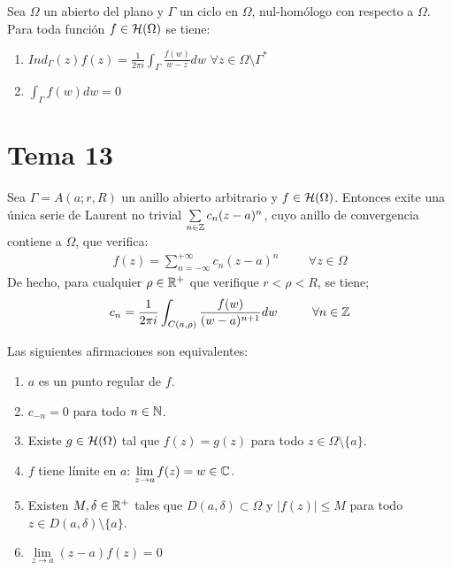 \documentclass[12pt]{article}
\begin{document}
    \begin{teo} Sea $\Omega$ un abierto del plano y $\Gamma$ un ciclo en $\Omega$, nul-homólogo con respecto a $\Omega$. Para toda función $f\in \mathcal{H}(\Omega)$ se tiene:
    \begin{enumerate}
        \item $\displaystyle Ind_\Gamma (z)f(z) = \frac{1}{2\pi i} \int_\Gamma \frac{f(w)}{w-z} dw$ \hspace{1cm} $\forall z \in \Omega \setminus \Gamma^*$
        \item $\displaystyle \int_\Gamma f(w) dw = 0$
    \end{enumerate}
    \end{teo}

    \newpage

    \section{Tema 13}

    \begin{teo} Sea $\Gamma = A(a;r,R)$ un anillo abierto arbitrario y $f\in \mathcal{H}(\Omega)$. Entonces exite una única serie de Laurent no trivial $\sum\limits_{n \in \mathbb{Z}}c_n(z-a)^n$, cuyo anillo de convergencia contiene a $\Omega$, que verifica:
    \begin{gather*}
        f(z) = \sum\limits_{n=-\infty}^{+\infty} c_n(z-a)^n \hspace{1cm} \forall z \in \Omega
    \end{gather*}
    De hecho, para cualquier $\rho\in \mathbb{R}^+$ que verifique $r < \rho < R$, se tiene;
    \begin{gather*}
        c_n = \frac{1}{2\pi i} \int_{C(a, \rho)} \frac{f(w)}{(w-a)^{n+1}}dw \hspace{1cm} \forall n \in \mathbb{Z}
    \end{gather*}
    \end{teo}

    \begin{prop}
        Las siguientes afirmaciones son equivalentes:
        \begin{enumerate}
            \item $a$ es un punto regular de $f$.
            \item $c_{-n} = 0 $ para todo $n\in \mathbb{N}$.
            \item Existe $g\in \mathcal{H}(\Omega)$ tal que $f(z) = g(z)$ para todo $z \in \Omega \setminus \{a\}$.
            \item $f$ tiene límite en $a$: $\lim\limits_{z\to a } f(z) = w \in \mathbb{C}$.
            \item Existen $M,\delta\in \mathbb{R}^+$ tales que $D(a, \delta) \subset \Omega$ y $|f(z)|\leq M$ para todo $z\in D(a,\delta)\setminus \{a\}$.
            \item $\lim\limits_{z\to a} (z-a)f(z) = 0$
        \end{enumerate}
    \end{prop}
\end{document}
